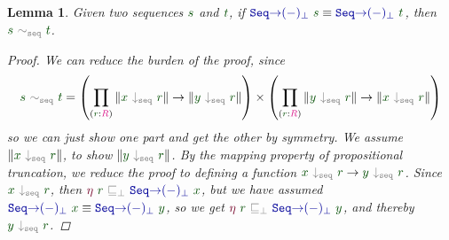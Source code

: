 \documentclass[twoside,11pt,openright]{report}
\theoremstyle{plain} %
\newtheorem{lem}[thm]{Lemma}
\theoremstyle{definition}
\theoremstyle{remark}
\newcommand*{\term}[1]{\textcolor{green!30!black}{#1}} %
\newcommand*{\type}[1]{\textcolor{magenta!90!black}{#1}}
\newcommand*{\relation}[1]{\textcolor{gray}{\ensuremath{\mathtt{#1}}}}
\newcommand*{\function}[1]{\textcolor{blue!60!black}{\ensuremath{\mathtt{#1}}}}
\newcommand*{\constructor}[1]{\textcolor{purple!60!black}{\ensuremath{\mathtt{#1}}}}
\begin{document}
\begin{lem}
  \label{eq:injectivity-lemma}
  Given two sequences \(\term{s}\) and \(\term{t}\), if \(\function{Seq{\rightarrow}(-)_\bot}~\term{s} \equiv \function{Seq{\rightarrow}(-)_\bot}~\term{t}\), then \(\term{s}~\relation{\sim_{seq}}~\term{t}\).
  \begin{proof}
    We can reduce the burden of the proof, since
    \begin{equation}
      \term{s}~\relation{\sim_{seq}}~\term{t} = \left(\prod_{(\term{r} : \type{R})} \| \term{x}~\relation{\downarrow_{seq}}~\term{r} \| \rightarrow \| \term{y}~\relation{\downarrow_{seq}}~\term{r} \|\right) \times \left(\prod_{(\term{r} : \type{R})} \| \term{y}~\relation{\downarrow_{seq}}~\term{r} \| \rightarrow \| \term{x}~\relation{\downarrow_{seq}}~\term{r} \|\right)
    \end{equation}
    so we can just show one part and get the other by symmetry. We assume \(\| \term{x}~\relation{\downarrow_{seq}}~\term{r} \|\), to show \(\| \term{y}~\relation{\downarrow_{seq}}~\term{r} \|\). By the mapping property of propositional truncation, we reduce the proof to defining a function \(\term{x}~\relation{\downarrow_{seq}}~\term{r} \rightarrow \term{y}~\relation{\downarrow_{seq}}~\term{r}\). Since \(\term{x}~\relation{\downarrow_{seq}}~\term{r}\), then \(\constructor{\eta}~\term{r}~\relation{\sqsubseteq_{\bot}}~\function{Seq{\rightarrow}(-)_\bot}~\term{x}\), but we have assumed \(\function{Seq{\rightarrow}(-)_\bot}~\term{x} \equiv \function{Seq{\rightarrow}(-)_\bot}~\term{y}\), so we get \(\constructor{\eta}~\term{r}~\relation{\sqsubseteq_{\bot}}~\function{Seq{\rightarrow}(-)_\bot}~\term{y}\), and thereby \(\term{y}~\relation{\downarrow_{seq}}~\term{r}\).
  \end{proof}
\end{lem}
\end{document}
